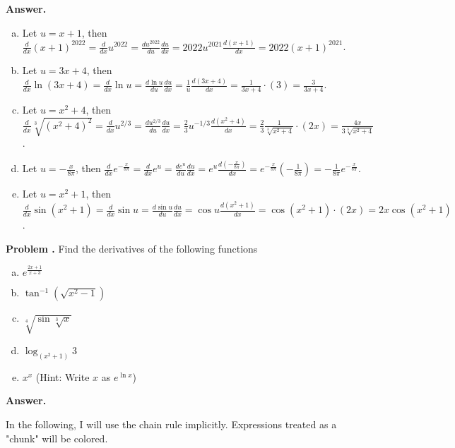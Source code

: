 \documentclass[11pt,letterpaper]{article}
\newcounter{problem}
\newcommand{\problem}{
	\stepcounter{problem}%
	\noindent \textbf{Problem \theproblem. }%
}
\newcommand{\answer}{\noindent \textbf{Answer. }}
\begin{document}
\answer
\begin{enumerate}[(a)]
    \item Let $u = x+1$, then $\frac{d}{dx}(x+1)^{2022} = \frac{d}{dx}u^{2022} = \frac{du^{2022}}{du}\frac{du}{dx} = 2022u^{2021}\frac{d(x+1)}{dx} = 2022(x+1)^{2021}$.
    \item Let $u = 3x+4$, then $\frac{d}{dx}\ln(3x+4) = \frac{d}{dx}\ln u = \frac{d \ln u}{du}\frac{du}{dx} = \frac{1}{u}\frac{d (3x+4)}{dx} = \frac{1}{3x+4}\cdot(3) = \frac{3}{3x+4}$.
    \item Let $u = x^2+4$, then $\frac{d}{dx}\sqrt[3]{(x^2+4)^2} = \frac{d}{dx} u^{2/3} = \frac{d u^{2/3}}{du}\frac{du}{dx} = \frac{2}{3}u^{-1/3}\frac{d (x^2+4)}{dx} = \frac{2}{3}\frac{1}{\sqrt[3]{x^2+4}}\cdot(2x) = \frac{4x}{3\sqrt[3]{x^2+4}}$.
    \item Let $u = -\frac{x}{8\pi}$, then $\frac{d}{dx}e^{-\frac{x}{8\pi}} = \frac{d}{dx}e^u = \frac{d e^u}{du}\frac{du}{dx} = e^u \frac{d (-\frac{x}{8\pi})}{dx} = e^{-\frac{x}{8\pi}}(-\frac{1}{8\pi}) = -\frac{1}{8\pi}e^{-\frac{x}{8\pi}}$.
    \item Let $u=x^2+1$, then $\frac{d}{dx}\sin(x^2+1) = \frac{d}{dx}\sin u = \frac{d \sin u}{du}\frac{du}{dx} = \cos u \frac{d (x^2+1)}{dx} = \cos (x^2+1) \cdot (2x) = 2x \cos(x^2+1)$.
\end{enumerate}\vspace{4mm}

\problem Find the derivatives of the following functions
\begin{enumerate}[(a)]
    \item $e^{\frac{2x+1}{x+3}}$
    \item $\tan^{-1}(\sqrt{x^2-1})$
    \item $\sqrt[4]{\sin\sqrt[3]{x}}$
    \item $\log_{(x^2+1)} 3$
    \item $x^x$ \quad (Hint: Write $x$ as $e^{\ln x}$)
\end{enumerate}\vspace{4mm}

\answer 

\noindent In the following, I will use the chain rule implicitly.  Expressions treated as a "chunk" will be colored.
\end{document}
